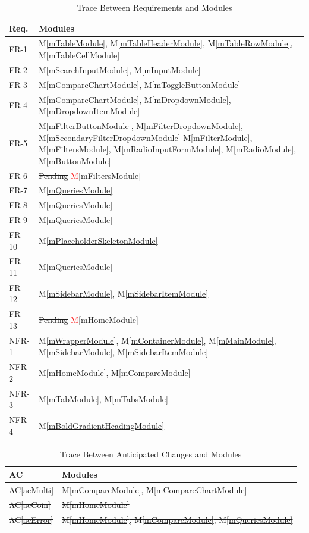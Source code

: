 \documentclass[12pt, titlepage]{article}
\newcommand{\acref}[1]{AC\ref{#1}}
\newcommand{\mref}[1]{M\ref{#1}}
\begin{document}
\begin{table}[H]
\centering
\begin{tabular}{p{} p{}}
\toprule
\textbf{Req.} & \textbf{Modules}\\
\midrule
FR-1 & \mref{mTableModule}, \mref{mTableHeaderModule}, \mref{mTableRowModule}, \mref{mTableCellModule}\\
FR-2 & \mref{mSearchInputModule}, \mref{mInputModule}\\
FR-3 & \mref{mCompareChartModule}, \mref{mToggleButtonModule}\\
FR-4 & \mref{mCompareChartModule}, \mref{mDropdownModule}, \mref{mDropdownItemModule}\\
FR-5 & \mref{mFilterButtonModule}, \mref{mFilterDropdownModule}, \mref{mSecondaryFilterDropdownModule} \mref{mFilterModule}, \mref{mFiltersModule}, \mref{mRadioInputFormModule}, \mref{mRadioModule}, \mref{mButtonModule}\\
FR-6 & \sout{Pending} \textcolor{red}{\mref{mFiltersModule}}\\
FR-7 & \mref{mQueriesModule}\\
FR-8 & \mref{mQueriesModule}\\
FR-9 & \mref{mQueriesModule}\\
FR-10 & \mref{mPlaceholderSkeletonModule}\\
FR-11 & \mref{mQueriesModule}\\
FR-12 & \mref{mSidebarModule}, \mref{mSidebarItemModule}\\
FR-13 & \sout{Pending} \textcolor{red}{\mref{mHomeModule}} \\

NFR-1 & \mref{mWrapperModule}, \mref{mContainerModule}, \mref{mMainModule}, \mref{mSidebarModule}, \mref{mSidebarItemModule}\\
NFR-2 & \mref{mHomeModule}, \mref{mCompareModule}\\
NFR-3 & \mref{mTabModule}, \mref{mTabsModule}\\
NFR-4 & \mref{mBoldGradientHeadingModule}\\
\bottomrule
\end{tabular}
\caption{Trace Between Requirements and Modules}
\label{TblRT}
\end{table}

\begin{table}[H]
\centering
\begin{tabular}{p{} p{}}
\toprule
\textbf{AC} & \textbf{Modules}\\
\midrule
\sout{\acref{acMulti}} & \sout{\mref{mCompareModule}, \mref{mCompareChartModule}}\\
\sout{\acref{acCoin}} & \sout{\mref{mHomeModule}}\\
\sout{\acref{acError}} & \sout{\mref{mHomeModule}, \mref{mCompareModule}, \mref{mQueriesModule}} \\
\bottomrule
\end{tabular}
\caption{Trace Between Anticipated Changes and Modules}
\label{TblACT}
\end{table}
\end{document}
